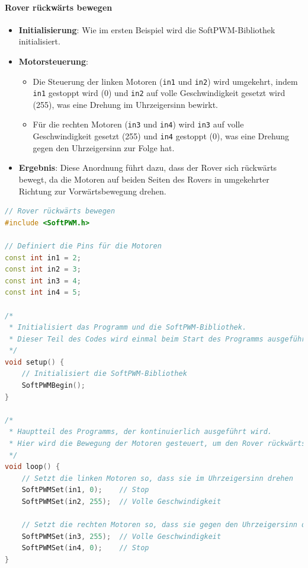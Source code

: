 \documentclass{vorlage-design-main}
\begin{document}
\hypertarget{rover-ruxfcckwuxe4rts-bewegen}{%
\paragraph{Rover rückwärts
bewegen}\label{rover-rueckwaerts-bewegen}}

\begin{itemize}

\item
  \textbf{Initialisierung}: Wie im ersten Beispiel wird die
  SoftPWM-Bibliothek initialisiert.
\item
  \textbf{Motorsteuerung}:

  \begin{itemize}
  
  \item
    Die Steuerung der linken Motoren (\verb|in1| und
    \verb|in2|) wird umgekehrt, indem
    \verb|in1| gestoppt wird (0) und
    \verb|in2| auf volle Geschwindigkeit gesetzt wird
    (255), was eine Drehung im Uhrzeigersinn bewirkt.
  \item
    Für die rechten Motoren (\verb|in3| und
    \verb|in4|) wird \verb|in3|
    auf volle Geschwindigkeit gesetzt (255) und
    \verb|in4| gestoppt (0), was eine Drehung gegen
    den Uhrzeigersinn zur Folge hat.
  \end{itemize}
\item
  \textbf{Ergebnis}: Diese Anordnung führt dazu, dass der Rover sich
  rückwärts bewegt, da die Motoren auf beiden Seiten des Rovers in
  umgekehrter Richtung zur Vorwärtsbewegung drehen.
\end{itemize}

\begin{lstlisting}[language={C++}]
// Rover rückwärts bewegen
#include <SoftPWM.h>

// Definiert die Pins für die Motoren
const int in1 = 2;
const int in2 = 3;
const int in3 = 4;
const int in4 = 5;

/*
 * Initialisiert das Programm und die SoftPWM-Bibliothek.
 * Dieser Teil des Codes wird einmal beim Start des Programms ausgeführt.
 */
void setup() {
    // Initialisiert die SoftPWM-Bibliothek
    SoftPWMBegin();
}

/*
 * Hauptteil des Programms, der kontinuierlich ausgeführt wird.
 * Hier wird die Bewegung der Motoren gesteuert, um den Rover rückwärts zu bewegen.
 */
void loop() {
    // Setzt die linken Motoren so, dass sie im Uhrzeigersinn drehen
    SoftPWMSet(in1, 0);    // Stop
    SoftPWMSet(in2, 255);  // Volle Geschwindigkeit

    // Setzt die rechten Motoren so, dass sie gegen den Uhrzeigersinn drehen
    SoftPWMSet(in3, 255);  // Volle Geschwindigkeit
    SoftPWMSet(in4, 0);    // Stop
}
\end{lstlisting}
\end{document}
